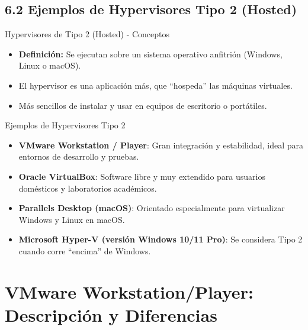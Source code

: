 \documentclass{beamer}
\begin{document}
\subsection{6.2 Ejemplos de Hypervisores Tipo 2 (Hosted)}
\begin{frame}{Hypervisores de Tipo 2 (Hosted) - Conceptos}
	\begin{itemize}
		\item \textbf{Definición:} Se ejecutan sobre un sistema operativo anfitrión (Windows, Linux o macOS).
		\item El hypervisor es una aplicación más, que “hospeda” las máquinas virtuales.
		\item Más sencillos de instalar y usar en equipos de escritorio o portátiles.
	\end{itemize}
\end{frame}

\begin{frame}{Ejemplos de Hypervisores Tipo 2}
	\begin{itemize}
		\item \textbf{VMware Workstation / Player}: Gran integración y estabilidad, ideal para entornos de desarrollo y pruebas.
		\item \textbf{Oracle VirtualBox}: Software libre y muy extendido para usuarios domésticos y laboratorios académicos.
		\item \textbf{Parallels Desktop (macOS)}: Orientado especialmente para virtualizar Windows y Linux en macOS.
		\item \textbf{Microsoft Hyper-V (versión Windows 10/11 Pro)}: Se considera Tipo 2 cuando corre “encima” de Windows.
	\end{itemize}
\end{frame}

\section{VMware Workstation/Player: Descripción y Diferencias}

\end{document}

